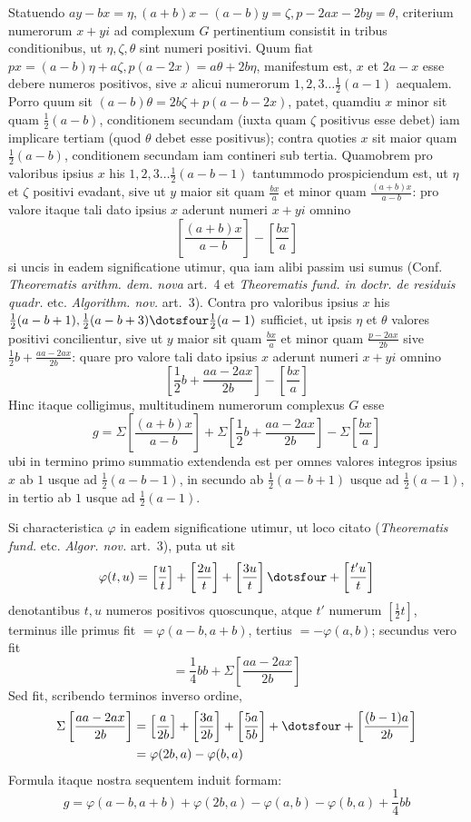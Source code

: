 %
Statuendo $ay-bx=\eta,(a+b)x-(a-b)y=\zeta,p-2ax-2by=\theta$, criterium numerorum $x+yi$ ad complexum $G$ pertinentium consistit in tribus conditionibus, ut $\eta,\zeta,\theta$ sint numeri positivi. Quum fiat $px=(a-b)\eta+a\zeta,p(a-2x)=a\theta+2b\eta$, manifestum est, $x$ et $2a-x$ esse debere numeros positivos, sive $x$ alicui numerorum $1,2,3\ldots\frac12(a-1)$ aequalem. Porro quum sit $(a-b)\theta=2b\zeta+p(a-b-2x)$, patet, quamdiu $x$ minor sit quam $\frac12(a-b)$, conditionem secundam (iuxta quam $\zeta$ positivus esse debet) iam implicare tertiam (quod $\theta$ debet esse positivus); contra quoties $x$ sit maior quam $\frac12(a-b)$, conditionem secundam iam contineri sub tertia. Quamobrem pro valoribus ipsius $x$ his $1,2,3\ldots\frac12(a-b-1)$ tantummodo prospiciendum est, ut $\eta$ et $\zeta$ positivi evadant, sive ut $y$ maior sit quam $\frac{bx}{a}$ et minor quam $\frac{(a+b)x}{a-b}$: pro valore itaque tali dato ipsius $x$ aderunt numeri $x+yi$ omnino
\[
\left[\frac{(a+b)x}{a-b}\right]-\left[\frac{bx}{a}\right]
\]
si uncis in eadem significatione utimur, qua iam alibi passim usi sumus (Conf. \emph{Theorematis arithm. dem. nova} art.~4 et \emph{Theorematis fund. in doctr. de residuis quadr.} etc. \emph{Algorithm. nov.} art.~3). Contra pro valoribus ipsius $x$ his $\frac12(a-b+1),\frac12(a-b+3)\dotsfour\frac12(a-1)$ sufficiet, ut ipsis $\eta$ et $\theta$ valores positivi concilientur, sive ut $y$ maior sit quam $\frac{bx}{a}$ et minor quam $\frac{p-2ax}{2b}$ sive $\frac12b+\frac{aa-2ax}{2b}$: quare pro valore tali dato ipsius $x$ aderunt numeri $x+yi$ omnino
\[
\left[\frac12b+\frac{aa-2ax}{2b}\right]-\left[\frac{bx}{a}\right]
\]
Hinc itaque colligimus, multitudinem numerorum complexus $G$ esse
\[
g=\Sigma\left[\frac{(a+b)x}{a-b}\right]+\Sigma\left[\frac12b+\frac{aa-2ax}{2b}\right]-\Sigma\left[\frac{bx}{a}\right]
\]
ubi in termino primo summatio extendenda est per omnes valores integros ipsius $x$ ab $1$ usque ad $\frac12(a-b-1)$, in secundo ab $\frac12(a-b+1)$ usque ad $\frac12(a-1)$, in tertio ab $1$ usque ad $\frac12(a-1)$.

Si characteristica $\varphi$ in eadem significatione utimur, ut loco citato (\emph{Theorematis fund.} etc. \emph{Algor. nov.} art.~3), puta ut sit
\[
\varphi(t,u)=\left[\frac{u}{t}\right]+\left[\frac{2u}{t}\right]+\left[\frac{3u}{t}\right]\dotsfour+\left[\frac{t'u}{t}\right]
\]
denotantibus $t,u$ numeros positivos quoscunque, atque $t'$ numerum $[\frac12t]$, terminus ille primus fit $=\varphi(a-b,a+b)$, tertius $=-\varphi(a,b)$; secundus vero fit
%
\[
=\frac14bb+\Sigma\left[\frac{aa-2ax}{2b}\right]
\]
Sed fit, scribendo terminos inverso ordine,
\[
\begin{aligned}
\Sigma\left[\frac{aa-2ax}{2b}\right]&=\left[\frac{a}{2b}\right]+\left[\frac{3a}{2b}\right]+\left[\frac{5a}{5b}\right]+\dotsfour+\left[\frac{(b-1)a}{2b}\right]\\
&=\varphi(2b,a)-\varphi(b,a)
\end{aligned}
\]
Formula itaque nostra sequentem induit formam:
\[
g=\varphi(a-b,a+b)+\varphi(2b,a)-\varphi(a,b)-\varphi(b,a)+\frac14bb
\]


